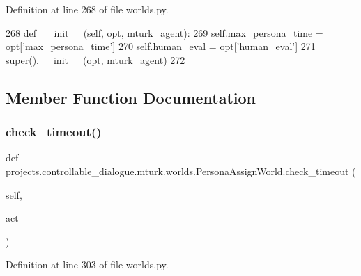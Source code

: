 Definition at line 268 of file worlds.\+py.


\begin{DoxyCode}
268     \textcolor{keyword}{def }\_\_init\_\_(self, opt, mturk\_agent):
269         self.max\_persona\_time = opt[\textcolor{stringliteral}{'max\_persona\_time'}]
270         self.human\_eval = opt[\textcolor{stringliteral}{'human\_eval'}]
271         super().\_\_init\_\_(opt, mturk\_agent)
272 
\end{DoxyCode}


\subsection{Member Function Documentation}
\mbox{\label{classprojects_1_1controllable__dialogue_1_1mturk_1_1worlds_1_1PersonaAssignWorld_acfc25a9685b1b254a2308304cc413723}} 
\subsubsection{\texorpdfstring{check\+\_\+timeout()}{check\_timeout()}}
{\footnotesize\ttfamily def projects.\+controllable\+\_\+dialogue.\+mturk.\+worlds.\+Persona\+Assign\+World.\+check\+\_\+timeout (\begin{DoxyParamCaption}\item[{}]{self,  }\item[{}]{act }\end{DoxyParamCaption})}



Definition at line 303 of file worlds.\+py.


